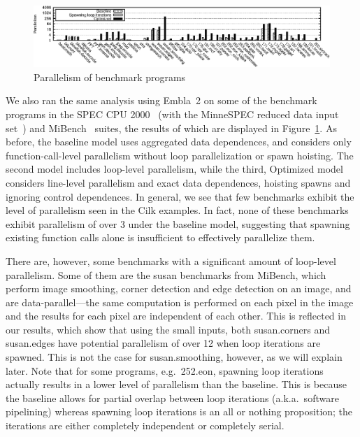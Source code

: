 \begin{figure}[t]
 \centering
\includegraphics[width=5in]{benches}
\caption{Parallelism of benchmark programs}
\label{benchmarks}
\end{figure}

We also ran the same analysis using Embla~2 on some of the benchmark programs in the SPEC CPU 2000~\cite{henning00spec} (with the MinneSPEC reduced data input set~\cite{KleinOsowski02minnespec}) and MiBench~\cite{guthaus01mibench} suites, the results of which are displayed in Figure~\ref{benchmarks}.
As before, the baseline model uses aggregated data dependences, and considers only function-call-level parallelism without loop parallelization or spawn hoisting.
The second model includes loop-level parallelism, while the third, \textsf{Optimized} model considers line-level parallelism and exact data dependences, hoisting spawns and ignoring control dependences.
In general, we see that few benchmarks exhibit the level of parallelism seen in the Cilk examples.
In fact, none of these benchmarks exhibit parallelism of over 3 under the baseline model,
suggesting that spawning existing function calls alone is insufficient to effectively parallelize them.

There are, however, some benchmarks with a significant amount of loop-level parallelism.
Some of them are the \textsf{susan} benchmarks from MiBench, which perform image smoothing, corner detection and edge detection on an image, and are data-parallel---the same computation is performed on each pixel in the image and the results for each pixel are independent of each other.
This is reflected in our results, which show that using the small inputs, both \textsf{susan.corners} and \textsf{susan.edges} have potential parallelism of over 12 when loop iterations are spawned.
This is not the case for \textsf{susan.smoothing}, however, as we will explain later.
Note that for some programs, e.g.\ \textsf{252.eon}, spawning loop iterations actually results in a lower level of parallelism than the baseline.
This is because the baseline allows for partial overlap between loop iterations (a.k.a.\ software pipelining) whereas spawning loop iterations is an all or nothing proposition; the iterations are either completely independent or completely serial.

